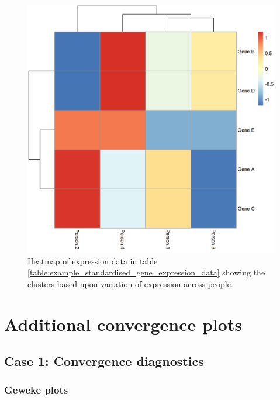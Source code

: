 \documentclass[12pt]{article} %
\begin{document}
\begin{figure}[!htb]
	\centering
	\includegraphics[scale=0.55]{Images/Examples/example_standardised_expression_data.png}
	\caption{Heatmap of expression data in table \ref{table:example_standardised_gene_expression_data} showing the clusters based upon variation of expression across people.}
	\label{fig:example_standardised_expression_data}
\end{figure}


\section{Additional convergence plots}
\subsection{Case 1: Convergence diagnostics}

\subsubsection{Geweke plots}
\end{document}
